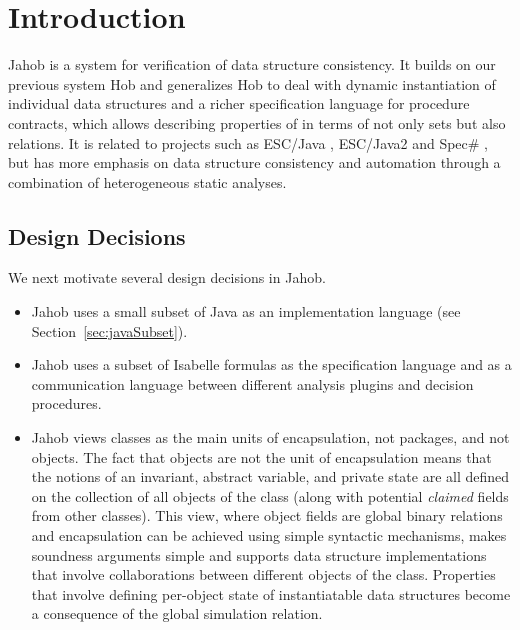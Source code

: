 \section{Introduction}

Jahob is a system for verification of data structure
consistency.  It builds on our previous system Hob
\cite{LamETAL05GeneralizedTypestateCheckingDataStructureConsistency,
LamETAL04HobProjectWebPage,
LamETAL04OurExperienceModularPluggableAnalyses,
LamETAL03OnModularPluggableAnalysesUsingSetInterfaces,
LamETAL05HobTool,
LamETAL05CrossCuttingTechniquesProgramSpecificationAnalysis} and
generalizes Hob to deal with dynamic instantiation of individual data
structures and a richer specification language for procedure
contracts, which allows describing properties of in terms of not only
sets but also relations.  It is related to projects such as ESC/Java
\cite{FlanaganETAL02ExtendedStaticCheckingJava}, ESC/Java2
\cite{CokKiniry04ESCJava2} and Spec\#
\cite{BarnettETAL04SpecProgrammingSystemOverview}, but has
more emphasis on data structure consistency and automation
through a combination of heterogeneous static analyses.

\subsection{Design Decisions}

We next motivate several design decisions in Jahob.
\begin{itemize}

\item Jahob uses a small subset of Java as an implementation language
(see Section~\ref{sec:javaSubset}).

\item Jahob uses a subset of Isabelle formulas as the specification language and as
a communication language between different analysis plugins and
decision procedures.

\item Jahob views classes as the main units of encapsulation, not packages, and not objects.
The fact that objects are not the unit of encapsulation means that the
notions of an invariant, abstract variable, and private state are all
defined on the collection of all objects of the class (along with
potential \emph{claimed} fields from other classes).  This view, where
object fields are global binary relations and encapsulation can be
achieved using simple syntactic mechanisms, makes soundness arguments
simple and supports data structure implementations that involve
collaborations between different objects of the class.  Properties
that involve defining per-object state of instantiatable data
structures become a consequence of the global simulation relation.

\end{itemize}
